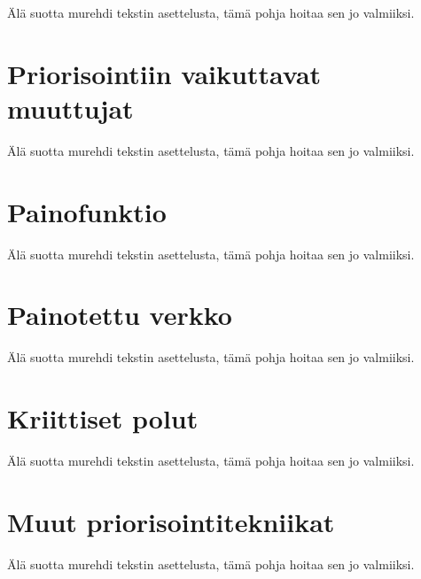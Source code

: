 Älä suotta murehdi tekstin asettelusta, tämä pohja hoitaa sen jo valmiiksi.

\section{Priorisointiin vaikuttavat muuttujat}

Älä suotta murehdi tekstin asettelusta, tämä pohja hoitaa sen jo valmiiksi.

\section{Painofunktio}

Älä suotta murehdi tekstin asettelusta, tämä pohja hoitaa sen jo valmiiksi.

\section{Painotettu verkko}

Älä suotta murehdi tekstin asettelusta, tämä pohja hoitaa sen jo valmiiksi.

\section{Kriittiset polut}

Älä suotta murehdi tekstin asettelusta, tämä pohja hoitaa sen jo valmiiksi.

\section{Muut priorisointitekniikat}

Älä suotta murehdi tekstin asettelusta, tämä pohja hoitaa sen jo valmiiksi.
